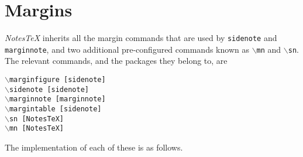 \documentclass[10pt]{article}
\begin{document}


	\newpage


	\section{Margins}\label{Sec:Margins}%
	\textit{NotesTeX} inherits all the margin commands that are used by \texttt{sidenote} and \texttt{marginnote}, and two additional pre-configured commands known as \texttt{$\backslash$mn} and \texttt{$\backslash$sn}. The relevant commands, and the packages they belong to, are
	\begin{center}
		\begin{multicols}{2}
		\noindent\texttt{$\backslash$marginfigure~[sidenote]\\
		$\backslash$sidenote~[sidenote]\\
		$\backslash$marginnote~[marginnote]\\
		$\backslash$margintable~[sidenote]\\
		$\backslash$sn~[NotesTeX]\\
		$\backslash$mn~[NotesTeX]\\
		}
	\end{multicols}
	\end{center}
	The implementation of each of these is as follows.
\end{document}
